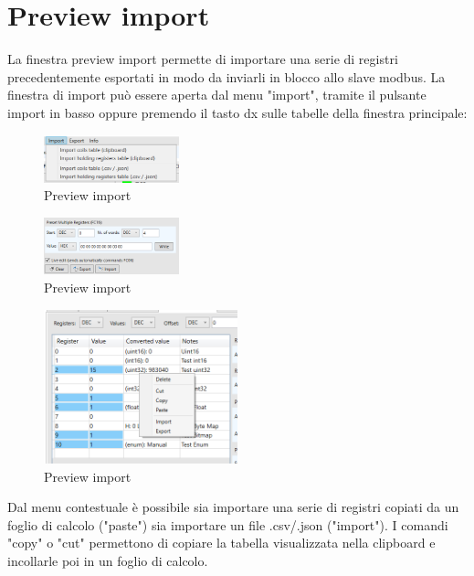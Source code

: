 
\chapter{Preview import}

La finestra preview import permette
di importare una serie di registri precedentemente esportati
in modo da inviarli in blocco allo slave modbus.
La finestra di import può essere aperta dal menu "import", 
tramite il pulsante import in basso oppure premendo il tasto
dx sulle tabelle della finestra principale:

\begin{figure}[H]
\centering
\includegraphics[width=0.35\textwidth]{../Img/Menu_Import.PNG}
\caption{Preview import}
\end{figure}

\begin{figure}[H]
\centering
\includegraphics[width=0.35\textwidth]{../Img/PreviewImport_OpenButton.PNG}
\caption{Preview import}
\end{figure}

\begin{figure}[H]
\centering
\includegraphics[width=0.50\textwidth]{../Img/PreviewImport_Open.PNG}
\caption{Preview import}
\end{figure}

Dal menu contestuale è possibile sia importare una serie di registri
copiati da un foglio di calcolo ("paste") sia importare un file
.csv/.json ("import"). I comandi "copy" o "cut" permettono di copiare 
la tabella visualizzata nella clipboard e incollarle poi in un foglio di calcolo.

